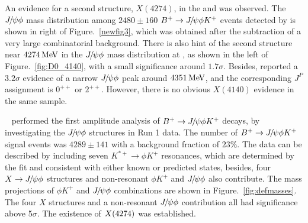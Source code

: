 An evidence for a second structure, $X(4274)$, in the \cdf\supercite{Aaltonen:2011at} and \cms\supercite{Chatrchyan:2013dma} was observed.
The ${{J\mskip -3mu/\mskip -2mu\psi}}\phi$ mass distribution among $2480\pm160$ ${{{B}^+}}\rightarrow{\ensuremath{{J\mskip -3mu/\mskip -2mu\psi}}}\phi K^+$ events detected by \cms is shown in right of Figure.~\ref{newfig3}, 
which was obtained after the subtraction of a very large combinatorial background.
There is also hint of the second structure near $4274 \text{\,Me\kern -0.1em V}$ in the ${{J\mskip -3mu/\mskip -2mu\psi}}\phi$ mass distribution at \dzero,
as shown in the left of Figure.~\ref{fig:D0_4140},
with a small significance around $1.7 \sigma$. 
Besides,
\belle reported a $3.2 \sigma$ evidence of a narrow ${{J\mskip -3mu/\mskip -2mu\psi}}\phi$ peak around $4351 \text{\,Me\kern -0.1em V}$,
and the corresponding $J^P$ assignment is $0^{++}$ or $2^{++}$.
However, there is no obvious $X(4140)$ evidence in the same sample\supercite{PhysRevLett.104.112004}.


\lhcb~\supercite{LHCb-PAPER-2016-018,LHCb-PAPER-2016-019} performed the first amplitude analysis of ${{{B}^+}}\rightarrow{\ensuremath{{J\mskip -3mu/\mskip -2mu\psi}}} \phi K^+$ decays,
by investigating the ${{J\mskip -3mu/\mskip -2mu\psi}} \phi$ structures in Run 1 data.
The number of ${{{B}^+}}\rightarrow{\ensuremath{{J\mskip -3mu/\mskip -2mu\psi}}} \phi K^+$ signal events was $4289\pm141$ with a background fraction of $23\%$.
The data can be described by including seven $K^{*+}\to\phi K^+$ resonances,
which are determined by the fit and consistent with either known or predicted states,
besides, 
four $X\rightarrow{\ensuremath{{J\mskip -3mu/\mskip -2mu\psi}}}\phi$ structures and non-resonant $\phi K^+$ and ${{J\mskip -3mu/\mskip -2mu\psi}} \phi$ also contribute.
The mass projections of $\phi K^+$ and ${{J\mskip -3mu/\mskip -2mu\psi}} \phi$ combinations are shown in Figure.~\ref{fig:defmasses}.
The four $X$ structures and a non-resonant ${{J\mskip -3mu/\mskip -2mu\psi}}\phi$ contribution all had significance above 5$\sigma$.
The existence of $X(4274)$ was established.

